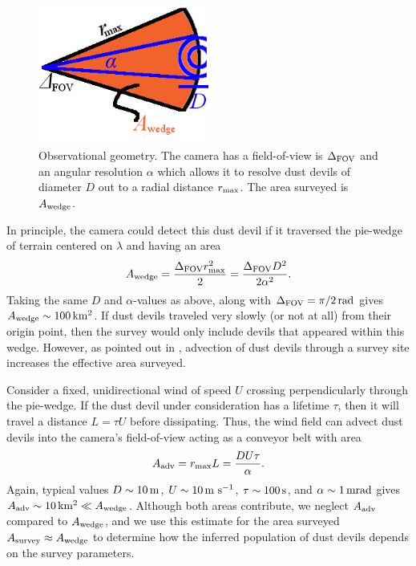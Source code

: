 \documentclass{aastex63}
\begin{document}
\begin{figure}
    \centering
    \includegraphics[width=0.5\textwidth]{figures/Awedge.jpg}
    \caption{Observational geometry. The camera has a field-of-view is $\Delta_{\rm FOV}$ and an angular resolution $\alpha$ which allows it to resolve dust devils of diameter $D$ out to a radial distance $r_{\rm max}$. The area surveyed is $A_{\rm wedge}$.}
    \label{fig:Awedge}
\end{figure}

In principle, the camera could detect this dust devil if it traversed the pie-wedge of terrain centered on $\lambda$ and having an area 
\begin{equation}
    A_{\rm wedge} = \frac{\Delta_{\rm FOV} r_{\rm max}^2}{2} = \frac{\Delta_{\rm FOV}D^2}{2 \alpha^2}.
    \label{eqn:A_wedge}
\end{equation}
Taking the same $D$ and $\alpha$-values as above, along with $\Delta_{\rm FOV} = \pi/2\,{\rm rad}$ gives $A_{\rm wedge} \sim 100\,{\rm km^2}$. If dust devils traveled very slowly (or not at all) from their origin point, then the survey would only include devils that appeared within this wedge. However, as pointed out in \citet{2014JAtS...71.4461L}, advection of dust devils through a survey site increases the effective area surveyed. 

Consider a fixed, unidirectional wind of speed $U$ crossing perpendicularly through the pie-wedge. If the dust devil under consideration has a lifetime $\tau$, then it will travel a distance $L = \tau U$ before dissipating. Thus, the wind field can advect dust devils into the camera's field-of-view acting as a conveyor belt with area
\begin{equation}
    A_{\rm adv} = r_{\rm max} L = \frac{D U \tau}{\alpha}.
    \label{eqn:A_adv}
\end{equation}
Again, typical values $D \sim 10\,{\rm m}$, $U \sim 10\,{\rm m\ s^{-1}}$, $\tau \sim 100\,{\rm s}$, and $\alpha \sim 1\,{\rm mrad}$ gives $A_{\rm adv} \sim 10\,{\rm km^2} \ll A_{\rm wedge}$. Although both areas contribute, we neglect $A_{\rm adv}$ compared to $A_{\rm wedge}$, and we use this estimate for the area surveyed $A_{\rm survey} \approx A_{\rm wedge}$ to determine how the inferred population of dust devils depends on the survey parameters.
\end{document}
